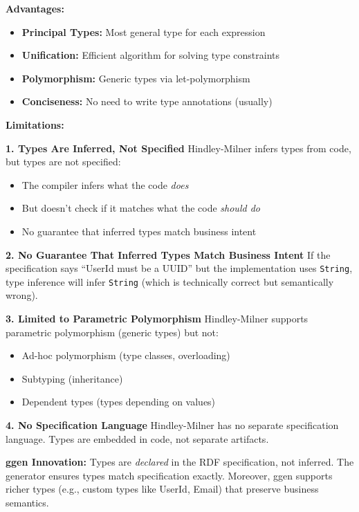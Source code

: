 \textbf{Advantages:}
\begin{itemize}
    \item \textbf{Principal Types:} Most general type for each expression
    \item \textbf{Unification:} Efficient algorithm for solving type constraints
    \item \textbf{Polymorphism:} Generic types via let-polymorphism
    \item \textbf{Conciseness:} No need to write type annotations (usually)
\end{itemize}

\textbf{Limitations:}

\textbf{1. Types Are Inferred, Not Specified}
Hindley-Milner infers types from code, but types are not specified:
\begin{itemize}
    \item The compiler infers what the code \textit{does}
    \item But doesn't check if it matches what the code \textit{should do}
    \item No guarantee that inferred types match business intent
\end{itemize}

\textbf{2. No Guarantee That Inferred Types Match Business Intent}
If the specification says ``UserId must be a UUID'' but the implementation uses \texttt{String}, type inference will infer \texttt{String} (which is technically correct but semantically wrong).

\textbf{3. Limited to Parametric Polymorphism}
Hindley-Milner supports parametric polymorphism (generic types) but not:
\begin{itemize}
    \item Ad-hoc polymorphism (type classes, overloading)
    \item Subtyping (inheritance)
    \item Dependent types (types depending on values)
\end{itemize}

\textbf{4. No Specification Language}
Hindley-Milner has no separate specification language. Types are embedded in code, not separate artifacts.

\textbf{ggen Innovation:} Types are \textit{declared} in the RDF specification, not inferred. The generator ensures types match specification exactly. Moreover, ggen supports richer types (e.g., custom types like UserId, Email) that preserve business semantics.

